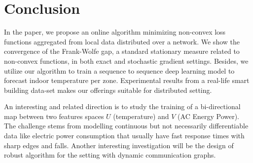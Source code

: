 \section{Conclusion}
\label{chap:conclusion}

In the paper, we propose an online algorithm minimizing non-convex loss functions aggregated from local data distributed over a network. We show the convergence of the Frank-Wolfe gap, a standard stationary measure related to non-convex functions, in both exact and stochastic gradient settings. 
Besides, we utilize our algorithm to train a sequence to sequence deep learning model to forecast indoor temperature per zone.
Experimental results from a real-life smart building data-set makes our offerings suitable for distributed setting.

\begin{comment}
We study the effect of topology between learners on forecasting indoor temperature and quite intuitively the complete graph performs robustly better.
We notice that the algorithm can be susceptible to cumulative noise and a trivial data driven method is used to eliminate bad data sources.
\end{comment}

An interesting and related direction is to study the training of a bi-directional map between two features spaces $U$ (temperature) and $V$ (AC Energy Power). The challenge stems from modelling continuous but not necessarily differentiable data like electric power consumption that usually have fast response times with sharp edges and falls.
Another interesting investigation will be the design of robust algorithm for the setting with dynamic communication graphs.  



